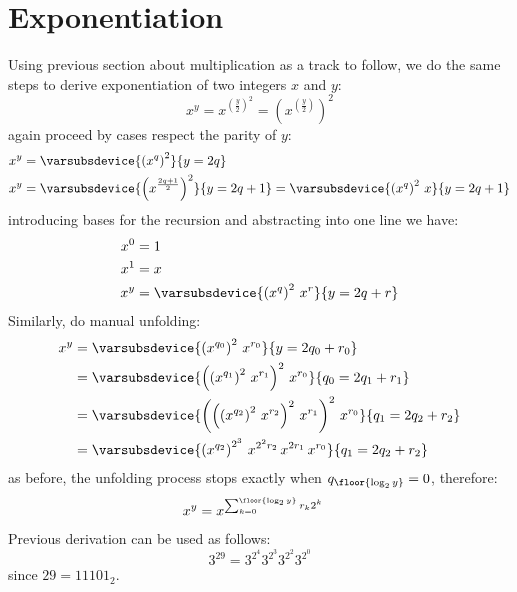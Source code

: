 \section{Exponentiation}

Using previous section about multiplication as a track to follow, 
we do the same steps to derive exponentiation of two integers $x$ and $y$:
\begin{displaymath}
    x^{y} = x^{\left(\frac{y}{2}\right)^{2}} = \left(x^{\left(\frac{y}{2}\right)}\right)^{2} 
\end{displaymath}
again proceed by cases respect the parity of $y$:
\begin{displaymath}
    \begin{split}
        x^{y} &= \varsubsdevice{\left(x^{q}\right)^{2}}{y=2q}\\
        x^{y} &= \varsubsdevice{\left(x^{\frac{2q+1}{2}}\right)^{2}}{y=2q+1}
               = \varsubsdevice{\left(x^{q}\right)^{2}\,x}{y=2q+1}\\
    \end{split}
\end{displaymath}
introducing bases for the recursion and abstracting into one line we have:
\begin{displaymath}
    \begin{split}
        x^{0} &= 1\\
        x^{1} &= x\\
        x^{y} &= \varsubsdevice{\left(x^{q}\right)^{2}\,x^{r}}{y=2q+r}\\
    \end{split}
\end{displaymath}
Similarly, do manual unfolding:
\begin{displaymath}
    \begin{split}
        x^{y} &= \varsubsdevice{\left(x^{q_{0}}\right)^{2}\,x^{r_{0}}}{y=2q_{0}+r_{0}}\\
              &= \varsubsdevice{\left(\left(x^{q_{1}}\right)^{2}\,x^{r_{1}}\right)^{2}\,x^{r_{0}}}{q_{0}=2q_{1}+r_{1}}\\
              &= \varsubsdevice{\left(\left(\left(x^{q_{2}}\right)^{2}\,x^{r_{2}}\right)^{2}\,x^{r_{1}} \right)^{2}\,x^{r_{0}}}
                    {q_{1}=2q_{2}+r_{2}}\\
              &= \varsubsdevice{\left(x^{q_{2}}\right)^{2^{3}}\,x^{2^{2}r_{2}}\,x^{2r_{1}}\,x^{r_{0}}}{q_{1}=2q_{2}+r_{2}}\\
    \end{split}
\end{displaymath}
as before, the unfolding process stops exactly when $q_{\floor{\log_{2}{y}}}=0$, therefore:
\begin{align}
    x^{y} &= x^{\sum_{k=0}^{\floor{\log_{2}{y}}}{r_{k}2^{k}}}
\end{align}
Previous derivation can be used as follows:
\begin{displaymath}
    3^{29} = 3^{2^{4}}3^{2^{3}}3^{2^{2}}3^{2^{0}}
\end{displaymath}
since $29 = {11101}_{2}$.

